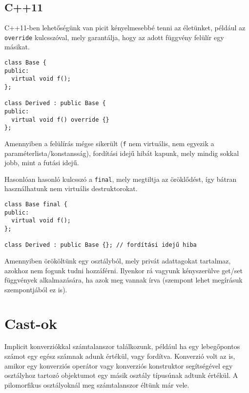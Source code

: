 \documentclass[../cpp_book/cpp_book.tex]{subfiles}
\begin{document}
	\subsection{C++11}
	C++11-ben lehetőségünk van picit kényelmesebbé tenni az életünket, például az \texttt{override} kulcsszóval, mely garantálja, hogy az adott függvény felülír egy másikat.
	\begin{lstlisting}
class Base {
public:
  virtual void f();
};

class Derived : public Base {
public:
  virtual void f() override {}
};
	\end{lstlisting}
	Amennyiben a felülírás mégse sikerült (\texttt{f} nem virtuális, nem egyezik a paraméterlista/konstansság), fordítási idejű hibát kapunk, mely mindig sokkal jobb, mint a futási idejű.
	
	\smallskip
	Hasonlóan hasonló kulcsszó a \texttt{final}, mely megtiltja az öröklődést, így bátran használhatunk nem virtuális destruktorokat.
	
	\begin{lstlisting}
class Base final {
public:
  virtual void f();
};

class Derived : public Base {}; // fordítási idejű hiba
	\end{lstlisting}
	Amennyiben örököltünk egy osztályból, mely privát adattagokat tartalmaz, azokhoz nem fogunk tudni hozzáférni. Ilyenkor rá vagyunk kényszerülve get/set függvények alkalmazására, ha azok meg vannak írva (szempont lehet megírásuk szempontjából ez is).
	\section{Cast-ok}
	Implicit konverziókkal számtalanszor találkozunk, például ha egy lebegőpontos számot egy egész számnak adunk értékül, vagy fordítva. Konverzió volt az is, amikor egy konverziós operátor vagy konverziós konstruktor segítségével egy osztályhoz tartozó objektumot egy másik osztály típusúnak adtunk értékül. A pilomorfikus osztályoknál meg számtalanszor éltünk már vele.
\end{document}
